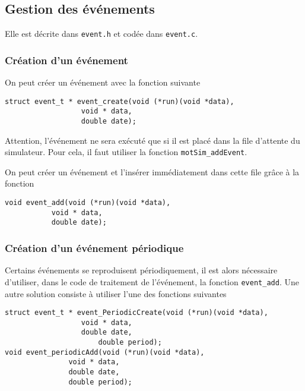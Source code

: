\documentclass{article}
\begin{document}
%
\subsection{Gestion des événements}

   Elle est décrite dans {\tt event.h} et codée dans {\tt event.c}.

%
\subsubsection{Création d'un événement}
 
   On peut créer un événement avec la fonction suivante 

\begin{verbatim}
struct event_t * event_create(void (*run)(void *data),
			      void * data,
			      double date);
\end{verbatim}

   Attention, l'événement ne sera exécuté que si il est placé dans la
file d'attente du simulateur. Pour cela, il faut utiliser la fonction
{\tt motSim\_addEvent}. 

   On peut créer un événement et l'insérer immédiatement dans cette
file grâce à la fonction

\begin{verbatim}
void event_add(void (*run)(void *data),
	       void * data,
	       double date);
\end{verbatim}

%
\subsubsection{Création d'un événement périodique}

   Certains événements se reproduisent périodiquement, il est alors
nécessaire d'utiliser, dans le code de traitement de l'événement, la
fonction {\tt event\_add}. Une autre solution consiste à utiliser
l'une des fonctions suivantes 

\begin{verbatim}
struct event_t * event_PeriodicCreate(void (*run)(void *data),
			      void * data,
			      double date,
		              double period);
void event_periodicAdd(void (*run)(void *data),
		       void * data,
		       double date,
		       double period);

\end{verbatim}
\end{document}
